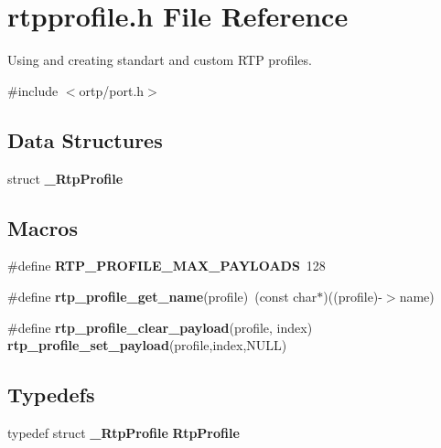 \section{rtpprofile.\+h File Reference}
\label{rtpprofile_8h}


Using and creating standart and custom R\+TP profiles.  


{\ttfamily \#include $<$ortp/port.\+h$>$}\newline
\subsection*{Data Structures}
\begin{DoxyCompactItemize}
\item 
struct \textbf{ \+\_\+\+Rtp\+Profile}
\end{DoxyCompactItemize}
\subsection*{Macros}
\begin{DoxyCompactItemize}
\item 
\mbox{\label{rtpprofile_8h_af2be9915d885625c964775baf6eefda6}} 
\#define {\bfseries R\+T\+P\+\_\+\+P\+R\+O\+F\+I\+L\+E\+\_\+\+M\+A\+X\+\_\+\+P\+A\+Y\+L\+O\+A\+DS}~128
\item 
\mbox{\label{rtpprofile_8h_a02a6d34b0884124a7049a7fceab82453}} 
\#define {\bfseries rtp\+\_\+profile\+\_\+get\+\_\+name}(profile)~(const char$\ast$)((profile)-\/$>$name)
\item 
\#define \textbf{ rtp\+\_\+profile\+\_\+clear\+\_\+payload}(profile,  index)~\textbf{ rtp\+\_\+profile\+\_\+set\+\_\+payload}(profile,index,N\+U\+LL)
\end{DoxyCompactItemize}
\subsection*{Typedefs}
\begin{DoxyCompactItemize}
\item 
\mbox{\label{rtpprofile_8h_a182cc7b12d0be9f5691c57c6fbd95538}} 
typedef struct \textbf{ \+\_\+\+Rtp\+Profile} {\bfseries Rtp\+Profile}
\end{DoxyCompactItemize}
